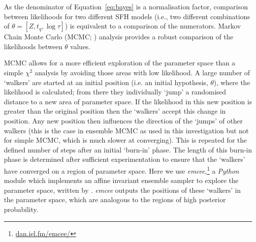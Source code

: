 \documentclass[useAMS,usenatbib]{mn2e}
\begin{document}


As the denominator of Equation~\ref{eq:bayes} is a normalisation factor, comparison between likelihoods for two different SFH models (i.e., two different combinations of $\theta = [Z, t_q, \log \tau]$) is equivalent to a comparison of the numerators. Markov Chain Monte Carlo (MCMC; \citealt{mackay03, emcee13, GW10}) analysis provides a robust comparison of the likelihoods between $\theta$ values.

MCMC allows for a more efficient exploration of the parameter space than a simple $\chi^2$ analysis by avoiding those areas with low likelihood. A large number of `walkers' are started at an initial position (i.e. an initial hypothesis, $\theta$), where the likelihood is calculated; from there they individually `jump' a randomised distance to a new area of parameter space. If the likelihood in this new position is greater than the original position then the `walkers' accept this change in position. Any new position then influences the direction of the  `jumps' of other walkers (this is the case in ensemble MCMC as used in this investigation but not for simple MCMC, which is much slower at converging). This is repeated for the defined number of steps after an initial `burn-in' phase. The length of this burn-in phase is determined after sufficient experimentation to ensure that the `walkers' have converged on a region of parameter space. Here we use \emph{emcee},\footnote{\url{dan.iel.fm/emcee/}} a \emph{Python} module which implements an affine invariant ensemble sampler to explore the parameter space, written by \cite{emcee13}. \emph{emcee} outputs the positions of these `walkers' in the parameter space, which are analogous to the regions of high posterior probability. 
\end{document}

